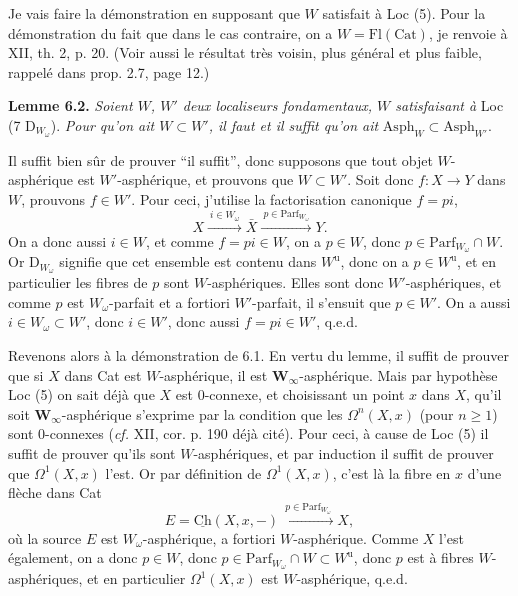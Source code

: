 Je vais faire la démonstration en supposant que $W$ satisfait à Loc (5). Pour la démonstration du fait que dans le cas contraire, on a $W = \mathrm{Fl}(\mathrm{Cat})$, je renvoie à XII, th. 2, p. 20. (Voir aussi le résultat très voisin, plus général et plus faible, rappelé dans prop. 2.7, page 12.)

\textbf{Lemme 6.2.} \textit{Soient $W$, $W'$ deux localiseurs fondamentaux, $W$ satisfaisant à} Loc (7 D$_{W_\omega}$). \textit{Pour qu'on ait $W \subset W'$, il faut et il suffit qu'on ait} $\mathrm{Asph}_W \subset \mathrm{Asph}_{W'}$.

Il suffit bien sûr de prouver “il suffit”, donc supposons que tout objet $W$-asphérique est $W'$-asphérique, et prouvons que $W \subset W'$. Soit donc $f : X \longrightarrow Y$ dans $W$, prouvons $f \in W'$. Pour ceci, j'utilise la factorisation canonique $f = pi$,
\[ X \xrightarrow{\ i \in W_\omega\ } \bar{X} \xrightarrow{\ p \in \mathrm{Parf}_{W_\omega}\ } Y. \]
On a donc aussi $i \in W$, et comme $f = pi \in W$, on a $p \in W$, donc $p \in \mathrm{Parf}_{W_\omega} \cap W$. Or D$_{W_\omega}$ signifie que cet ensemble est contenu dans $W^{\mathrm{u}}$, donc on a $p \in W^{\mathrm{u}}$, et en particulier les fibres de $p$ sont $W$-asphériques. Elles sont donc $W'$-asphériques, et comme $p$ est $W_\omega$-parfait et a fortiori $W'$-parfait, il s'ensuit que $p \in W'$. On a aussi $i \in W_\omega \subset W'$, donc $i \in W'$, donc aussi $f = pi \in W'$, q.e.d.

Revenons alors à la démonstration de 6.1. En vertu du lemme, il suffit de prouver que si $X$ dans Cat est $W$-asphérique, il est $\mathbf{W}_\infty$-asphérique. Mais par hypothèse Loc (5) on sait déjà que $X$ est 0-connexe, et choisissant un point $x$ dans $X$, qu'il soit $\mathbf{W}_\infty$-asphérique s'exprime par la condition
que les $\Omega^n(X,x)$ (pour $n \geq 1$) sont 0-connexes (\textit{cf.} XII, cor. p. 190 déjà cité). Pour ceci, à cause de Loc (5) il suffit de prouver qu'ils sont $W$-asphériques, et par induction il suffit de prouver que $\Omega^1(X,x)$ l'est. Or par définition de $\Omega^1(X,x)$, c'est là la fibre en $x$ d'une flèche dans Cat
\[ E = \underline{\mathrm{Ch}}(X,x,-) \xrightarrow{\ p \in \mathrm{Parf}_{W_\omega}\ } X, \]
où la source $E$ est $W_\omega$-asphérique, a fortiori $W$-asphérique. Comme $X$ l'est également, on a donc $p \in W$, donc $p \in \mathrm{Parf}_{W_\omega} \cap W \subset W^{\mathrm{u}}$, donc $p$ est à fibres $W$-asphériques, et en particulier $\Omega^1(X,x)$ est $W$-asphérique, q.e.d.

